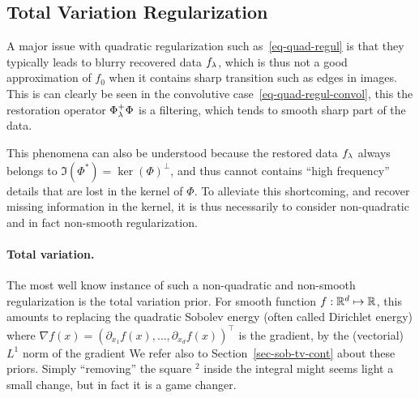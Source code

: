 \subsection{Total Variation Regularization}
\label{sec-tv-regul}

A major issue with quadratic regularization such as~\eqref{eq-quad-regul} is that they typically leads to blurry recovered data $f_\lambda$, which is thus not a good approximation of $f_0$ when it contains sharp transition such as edges in images. 
%
This is can clearly be seen in the convolutive case~\eqref{eq-quad-regul-convol}, this the restoration operator $\Phi_\lambda^+ \Phi$ is a filtering, which tends to smooth sharp part of the data.

This phenomena can also be understood because the restored data $f_\lambda$ always belongs to $\Im(\Phi^*)=\ker(\Phi)^\bot$, and thus cannot contains ``high frequency'' details that are lost in the kernel of $\Phi$. To alleviate this shortcoming, and recover missing information in the kernel, it is thus necessarily to consider non-quadratic and in fact non-smooth regularization. 

\paragraph{Total variation.}

The most well know instance of such a non-quadratic and non-smooth regularization is the total variation prior. For smooth function $f : \mathbb{R}^d \mapsto \mathbb{R}$, this amounts to replacing the quadratic Sobolev energy (often called Dirichlet energy) 
where $\nabla f(x) = (\partial_{x_1} f(x), \ldots, \partial_{x_d} f(x))^\top$ is the gradient, by the (vectorial) $L^1$ norm of the gradient
We refer also to Section~\ref{sec-sob-tv-cont} about these priors.
%
Simply ``removing'' the square $^2$ inside the integral might seems light a small change, but in fact it is a game changer. 

